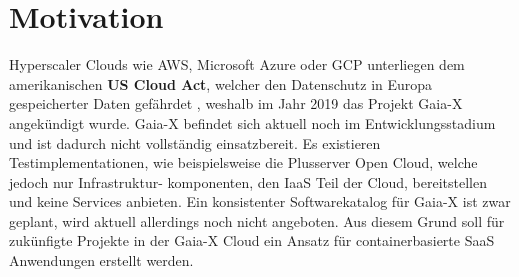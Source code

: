 \section{Motivation}
\label{sec:einleitung:motivation}
Hyperscaler Clouds wie \ac{AWS}, Microsoft Azure oder \ac{GCP} unterliegen dem amerikanischen \textbf{US Cloud Act}, welcher
den Datenschutz in Europa gespeicherter Daten gefährdet \cite{Kagermann2021}, weshalb im Jahr 2019 das Projekt Gaia-X angekündigt wurde.
Gaia-X befindet sich aktuell noch im Entwicklungsstadium und ist dadurch nicht vollständig einsatzbereit.
Es existieren Testimplementationen, wie beispielsweise die Plusserver Open Cloud, welche jedoch nur Infrastruktur-
komponenten, den \ac{IaaS} Teil der Cloud, bereitstellen und keine Services anbieten. Ein konsistenter Softwarekatalog für Gaia-X ist zwar geplant\cite{BMWi2019},
wird aktuell allerdings noch nicht angeboten. Aus diesem Grund soll für zukünfigte Projekte in der Gaia-X Cloud ein Ansatz
für containerbasierte \ac{SaaS} Anwendungen erstellt werden. 